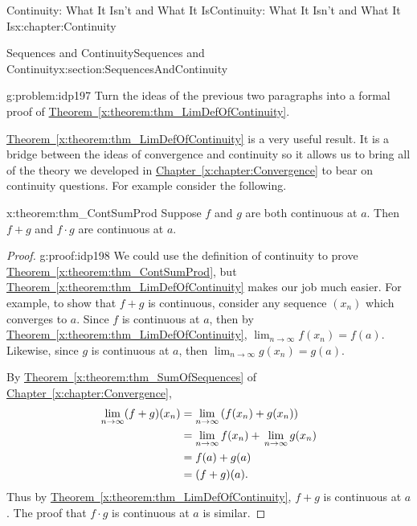 \begin{chapterptx}{Continuity: What It Isn't and What It Is}{}{Continuity: What It Isn't and What It Is}{}{}{x:chapter:Continuity}
\begin{sectionptx}{Sequences and Continuity}{}{Sequences and Continuity}{}{}{x:section:SequencesAndContinuity}
\begin{problem}{}{g:problem:idp197}
			 Turn the ideas of the previous two paragraphs into a formal proof of \hyperref[x:theorem:thm_LimDefOfContinuity]{Theorem~{\xreffont\ref{x:theorem:thm_LimDefOfContinuity}}}.%
		\end{problem}
		\hyperref[x:theorem:thm_LimDefOfContinuity]{Theorem~{\xreffont\ref{x:theorem:thm_LimDefOfContinuity}}} is a very useful result. It is a bridge between the ideas of convergence and continuity so it allows us to bring all of the theory we developed in \hyperref[x:chapter:Convergence]{Chapter~{\xreffont\ref{x:chapter:Convergence}}} to bear on continuity questions. For example consider the following.%
		\begin{theorem}{}{}{x:theorem:thm_ContSumProd}%
			 Suppose \(f\) and \(g\) are both continuous at \(a\). Then \(f+g\) and \(f\cdot g\) are continuous at \(a\).%
		\end{theorem}
		\begin{proof}{}{g:proof:idp198}
			We could use the definition of continuity to prove \hyperref[x:theorem:thm_ContSumProd]{Theorem~{\xreffont\ref{x:theorem:thm_ContSumProd}}}, but \hyperref[x:theorem:thm_LimDefOfContinuity]{Theorem~{\xreffont\ref{x:theorem:thm_LimDefOfContinuity}}} makes our job much easier.  For example, to show that \(f+g\) is continuous, consider any sequence \(\left(x_n\right)\) which converges to \(a\).  Since \(f\) is continuous at \(a\), then by \hyperref[x:theorem:thm_LimDefOfContinuity]{Theorem~{\xreffont\ref{x:theorem:thm_LimDefOfContinuity}}}, \(\lim_{n\rightarrow\infty}f(x_n)=f(a)\).  Likewise, since \(g\) is continuous at \(a\), then \(\lim_{n\rightarrow\infty}g(x_n)=g(a)\).%
			\par
			By \hyperref[x:theorem:thm_SumOfSequences]{Theorem~{\xreffont\ref{x:theorem:thm_SumOfSequences}}} of \hyperref[x:chapter:Convergence]{Chapter~{\xreffont\ref{x:chapter:Convergence}}},\(\)%
			\begin{alignat*}{1}
				\lim_{n\rightarrow\infty}(f+g)(x_n)&=\lim_{n\rightarrow\infty} \left(f(x_n)+g(x_n)\right)\\
				& =\lim_{n\rightarrow\infty}f(x_n)+\,\lim_{n \rightarrow\infty}g(x_n)\\
				& =f(a)+g(a)\\
				& =(f+g)(a)\text{.}
			\end{alignat*}
			Thus by \hyperref[x:theorem:thm_LimDefOfContinuity]{Theorem~{\xreffont\ref{x:theorem:thm_LimDefOfContinuity}}}, \(f+g\) is continuous at \(a\).  The proof that \(f\cdot g\) is continuous at \(a\) is similar.%

\end{proof}
\end{sectionptx}
\end{chapterptx}
